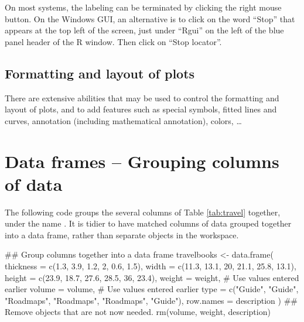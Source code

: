 On most systems, the labeling can be terminated by clicking the right
mouse button.  On the Windows GUI, an alternative is to click on the
word ``Stop'' that appears at the top left
of the screen, just under ``Rgui'' on the left of the blue panel
header of the R window. Then click on ``Stop locator''.

\subsection*{Formatting and layout of plots}
There are extensive abilities that may be used to control
the formatting and layout of plots, and to add features such as
special symbols, fitted lines and curves, annotation (including
mathematical annotation), colors, \ldots

\section{Data frames -- Grouping columns of data}\label{sec:df}

\vspace*{8pt}

The following code groups the several columns of Table
\ref{tab:travel} together, under the name .  It is
tidier to have matched columns of data grouped together into a data
frame, rather than separate objects in the workspace.
{\small
\begin{Schunk}
\begin{Sinput}
## Group columns together into a data frame
travelbooks <- data.frame(
   thickness = c(1.3, 3.9, 1.2, 2, 0.6, 1.5),
   width = c(11.3, 13.1, 20, 21.1, 25.8, 13.1),
   height = c(23.9, 18.7, 27.6, 28.5, 36, 23.4),
   weight = weight,  # Use values entered earlier
   volume = volume,  # Use values entered earlier
   type = c("Guide", "Guide", "Roadmaps", "Roadmaps",
            "Roadmaps", "Guide"),
   row.names = description
)
## Remove objects that are not now needed.
rm(volume, weight, description)
\end{Sinput}
\end{Schunk}
}

